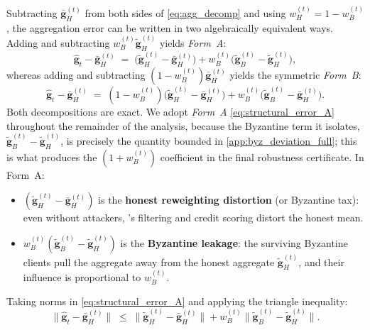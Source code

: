\documentclass[../main]{subfiles}
\begin{document}
Subtracting $\bar{\mathbf{g}}_H^{(t)}$ from both sides of \eqref{eq:agg_decomp} and using
$w_H^{(t)} = 1 - w_B^{(t)}$, the aggregation error can be written in two
algebraically equivalent ways. Adding and subtracting
$w_B^{(t)}\widetilde{\mathbf{g}}_H^{(t)}$ yields \emph{Form~A}:
\begin{equation}
    \hat{\mathbf{g}}_t - \bar{\mathbf{g}}_H^{(t)}
    \;=\; \bigl(\widetilde{\mathbf{g}}_H^{(t)} - \bar{\mathbf{g}}_H^{(t)}\bigr)
    + w_B^{(t)}\bigl(\widetilde{\mathbf{g}}_B^{(t)} - \widetilde{\mathbf{g}}_H^{(t)}\bigr),
    \label{eq:structural_error_A}
\end{equation}
whereas adding and subtracting $(1 - w_B^{(t)})\bar{\mathbf{g}}_H^{(t)}$ yields the
symmetric \emph{Form~B}:
\begin{equation}
    \hat{\mathbf{g}}_t - \bar{\mathbf{g}}_H^{(t)}
    \;=\; (1 - w_B^{(t)})\bigl(\widetilde{\mathbf{g}}_H^{(t)} - \bar{\mathbf{g}}_H^{(t)}\bigr)
    + w_B^{(t)}\bigl(\widetilde{\mathbf{g}}_B^{(t)} - \bar{\mathbf{g}}_H^{(t)}\bigr).
    \label{eq:structural_error_B}
\end{equation}
Both decompositions are exact. We adopt \emph{Form~A}
\eqref{eq:structural_error_A} throughout the remainder of the analysis, because
the Byzantine term it isolates, $\widetilde{\mathbf{g}}_B^{(t)} - \widetilde{\mathbf{g}}_H^{(t)}$,
is precisely the quantity bounded in \cref{app:byz_deviation_full}; this is what
produces the $(1 + w_B^{(t)})$ coefficient in the final robustness certificate.
In Form~A:
\begin{itemize}
    \item $(\widetilde{\mathbf{g}}_H^{(t)} - \bar{\mathbf{g}}_H^{(t)})$ is the \textbf{honest reweighting distortion} (or Byzantine tax): even without attackers, \aegis{}'s filtering and credit scoring distort the honest mean.
    \item $w_B^{(t)}(\widetilde{\mathbf{g}}_B^{(t)} - \widetilde{\mathbf{g}}_H^{(t)})$ is the \textbf{Byzantine leakage}: the surviving Byzantine clients pull the aggregate away from the honest aggregate $\widetilde{\mathbf{g}}_H^{(t)}$, and their influence is proportional to $w_B^{(t)}$.
\end{itemize}

Taking norms in \eqref{eq:structural_error_A} and applying the triangle inequality:
\begin{equation}
    \|\hat{\mathbf{g}}_t - \bar{\mathbf{g}}_H^{(t)}\|
    \;\leq\; \|\widetilde{\mathbf{g}}_H^{(t)} - \bar{\mathbf{g}}_H^{(t)}\|
    + w_B^{(t)}\|\widetilde{\mathbf{g}}_B^{(t)} - \widetilde{\mathbf{g}}_H^{(t)}\|.
    \label{eq:error_triangle}
\end{equation}
\end{document}
